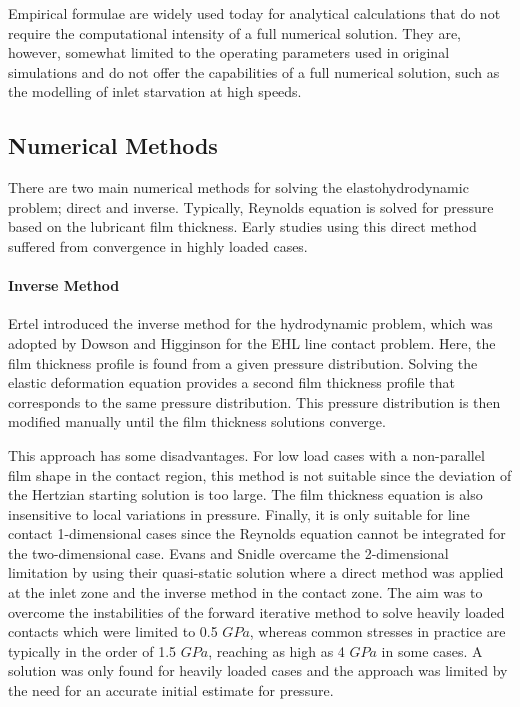 Empirical formulae are widely used today for analytical calculations that do not require the computational intensity of a full numerical solution. They are, however, somewhat limited to the operating parameters used in original simulations and do not offer the capabilities of a full numerical solution, such as the modelling of inlet starvation at high speeds.

\subsection{Numerical Methods}

There are two main numerical methods for solving the elastohydrodynamic problem; direct and inverse. Typically, Reynolds equation is solved for pressure based on the lubricant film thickness. Early studies using this direct method suffered from convergence in highly loaded cases.

\paragraph{Inverse Method}

Ertel \cite{Ertel1939} introduced the inverse method for the hydrodynamic problem, which was adopted by Dowson and Higginson \cite{Dowson1959} for the EHL line contact problem. Here, the film thickness profile is found from a given pressure distribution. Solving the elastic deformation equation provides a second film thickness profile that corresponds to the same pressure distribution. This pressure distribution is then modified manually until the film thickness solutions converge.

This approach has some disadvantages. For low load cases with a non-parallel film shape in the contact region, this method is not suitable since the deviation of the Hertzian starting solution is too large. The film thickness equation is also insensitive to local variations in pressure. Finally, it is only suitable for line contact 1-dimensional cases since the Reynolds equation cannot be integrated for the two-dimensional case. Evans and Snidle \cite{Evans1982} overcame the 2-dimensional limitation by using their quasi-static solution where a direct method was applied at the inlet zone and the inverse method in the contact zone. The aim was to overcome the instabilities of the forward iterative method to solve heavily loaded contacts which were limited to 0.5 $GPa$, whereas common stresses in practice are typically in the order of 1.5 $GPa$, reaching as high as 4 $GPa$ in some cases. A solution was only found for heavily loaded cases and the approach was limited by the need for an accurate initial estimate for pressure.

